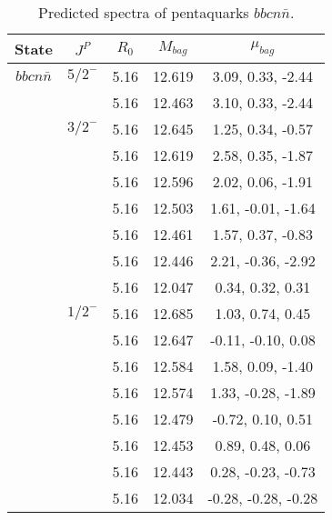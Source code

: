 \documentclass[prd,twocolumn,floatfix,nofootinbib]{revtex4}
\begin{document}
\renewcommand{\tabcolsep}{0.5cm}
\renewcommand{\arraystretch}{1.2}
\begin{table*}[!htbp]
    \caption{Predicted spectra of pentaquarks $bbcn\bar{n}$.}
    \begin{tabular}{ccccc}
        \hline\hline
        {\rm State} &$J^{P}$ &$R_{0}$ &$M_{bag}$ &$\mu_{bag}$ \\ \hline
        ${bbcn\bar{n}}$
            &${5/2}^{-}$    &5.16   &12.619 &3.09, 0.33, -2.44 \\
            &               &5.16   &12.463 &3.10, 0.33, -2.44 \\
            &${3/2}^{-}$    &5.16   &12.645 &1.25, 0.34, -0.57 \\
            &               &5.16   &12.619 &2.58, 0.35, -1.87 \\
            &               &5.16   &12.596 &2.02, 0.06, -1.91 \\
            &               &5.16   &12.503 &1.61, -0.01, -1.64 \\
            &               &5.16   &12.461 &1.57, 0.37, -0.83 \\
            &               &5.16   &12.446 &2.21, -0.36, -2.92 \\
            &               &5.16   &12.047 &0.34, 0.32, 0.31 \\
            &${1/2}^{-}$    &5.16   &12.685 &1.03, 0.74, 0.45 \\
            &               &5.16   &12.647 &-0.11, -0.10, 0.08 \\
            &               &5.16   &12.584 &1.58, 0.09, -1.40 \\
            &               &5.16   &12.574 &1.33, -0.28, -1.89 \\
            &               &5.16   &12.479 &-0.72, 0.10, 0.51 \\
            &               &5.16   &12.453 &0.89, 0.48, 0.06 \\
            &               &5.16   &12.443 &0.28, -0.23, -0.73 \\
            &               &5.16   &12.034 &-0.28, -0.28, -0.28 \\

        \hline\hline
    \end{tabular}
\end{table*}
\end{document}
